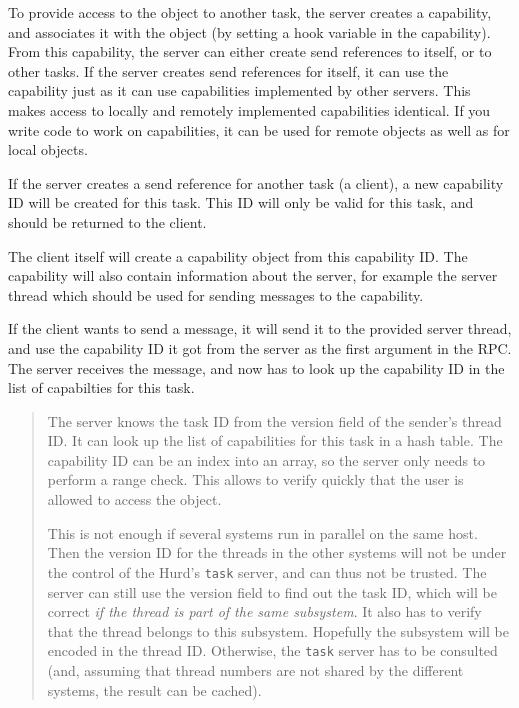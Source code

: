 \documentclass[9pt,a4paper]{extarticle}
\newenvironment{comment}{\footnotesize \begin{quote}}{\end{quote}}
\begin{document}
To provide access to the object to another task, the server creates a
capability, and associates it with the object (by setting a hook
variable in the capability).  From this capability, the server can
either create send references to itself, or to other tasks.  If the
server creates send references for itself, it can use the capability
just as it can use capabilities implemented by other servers.  This
makes access to locally and remotely implemented capabilities
identical.  If you write code to work on capabilities, it can be used
for remote objects as well as for local objects.

If the server creates a send reference for another task (a client), a
new capability ID will be created for this task.  This ID will only be
valid for this task, and should be returned to the client.

The client itself will create a capability object from this capability
ID.  The capability will also contain information about the server,
for example the server thread which should be used for sending
messages to the capability.

If the client wants to send a message, it will send it to the provided
server thread, and use the capability ID it got from the server as the
first argument in the RPC.  The server receives the message, and now
has to look up the capability ID in the list of capabilties for this
task.

\begin{comment}
  The server knows the task ID from the version field of the sender's
  thread ID.  It can look up the list of capabilities for this task in
  a hash table.  The capability ID can be an index into an array, so
  the server only needs to perform a range check.  This allows to
  verify quickly that the user is allowed to access the object.
  
  This is not enough if several systems run in parallel on the same
  host.  Then the version ID for the threads in the other systems will
  not be under the control of the Hurd's \texttt{task} server, and can
  thus not be trusted.  The server can still use the version field to
  find out the task ID, which will be correct \emph{if the thread is
    part of the same subsystem}.  It also has to verify that the
  thread belongs to this subsystem.  Hopefully the subsystem will be
  encoded in the thread ID.  Otherwise, the \texttt{task} server has
  to be consulted (and, assuming that thread numbers are not shared by
  the different systems, the result can be cached).
\end{comment}
\end{document}
